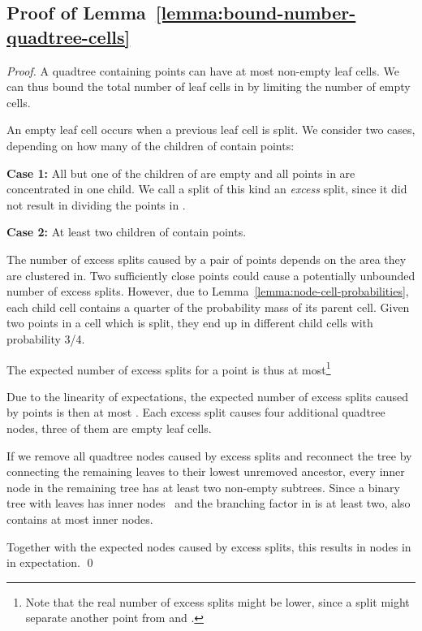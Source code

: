 \documentclass{llncs}
\begin{document}
\subsection{Proof of Lemma~\ref{lemma:bound-number-quadtree-cells}}
\label{sub:proof-lemma-bound-number-quadtree-cells}
\begin{proof}
A quadtree  containing  points can have at most  non-empty leaf cells. We can thus bound the total number of leaf cells in  by limiting the number of empty cells.

An empty leaf cell occurs when a previous leaf cell  is split.
We consider two cases, depending on how many of the children of  contain points:

\textbf{Case 1:} All but one of the children of  are empty and all points in  are concentrated in one child.
We call a split of this kind an \emph{excess} split, since it did not result in dividing the points in .

\textbf{Case 2:} At least two children of  contain points.

The number of excess splits caused by a pair of points depends on the area they are clustered in.
Two sufficiently close points could cause a potentially unbounded number of excess splits.
However, due to Lemma~\ref{lemma:node-cell-probabilities}, each child cell contains a quarter of the probability mass of its parent cell.
Given two points  in a cell which is split, they end up in different child cells with probability 3/4.

The expected number of excess splits for a point  is thus at most\footnote{Note that the real number of excess splits might be lower, since a split might separate another point from  and .}


Due to the linearity of expectations, the expected number of excess splits caused by  points is then at most .
Each excess split causes four additional quadtree nodes, three of them are empty leaf cells.

If we remove all quadtree nodes caused by excess splits and reconnect the tree by connecting the remaining leaves
to their lowest unremoved ancestor, every inner node in the remaining tree  has at least two non-empty subtrees.
Since a binary tree with  leaves has  inner nodes~\cite{Samet:2005:FMM:1076819} and the branching factor in  is at least two,  also contains at most  inner nodes.

Together with the expected  nodes caused by excess splits, this results in  nodes in  in expectation.
\qed
\end{proof}
\end{document}
